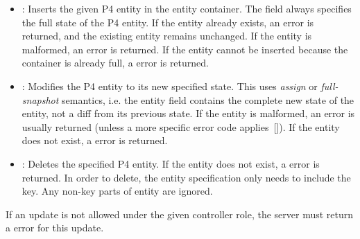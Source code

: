 \documentclass[11pt]{article}
\begin{document}
{\begin{itemize}
\item{}
: Inserts the given P4 entity in the entity container.
The  field always specifies the full state of the P4 entity.
If the entity already exists, an  error is returned, and
the existing entity remains unchanged.
If the entity is malformed, an  error is returned.
If the entity cannot be inserted because the container is already full,
a  error is returned.%

\item{}
: Modifies the P4 entity to its new specified state. This uses
\emph{assign} or \emph{full-snapshot} semantics, i.e. the entity field contains the
complete new state of the entity, not a diff from its previous state. If the
entity is malformed, an  error is usually returned (unless a
more specific error code applies~[]). If the entity does not
exist, a  error is returned.%

\item{}
: Deletes the specified P4 entity. If the entity does not exist, a
 error is returned. In order to delete, the entity specification
only needs to include the key. Any non-key parts of entity are ignored.%
\end{itemize}%

\noindent{}If an update is not allowed under the given controller role, the server must
return a  error for this update.%

}
\end{document}

